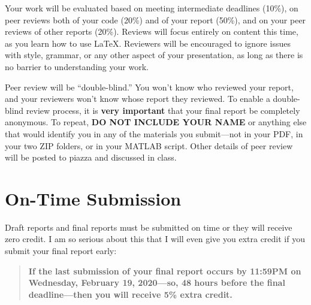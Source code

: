 \documentclass[conf]{new-aiaa}
\begin{document}
Your work will be evaluated based on meeting intermediate deadlines (10\%), on peer reviews both of your code (20\%) and of your report (50\%), and on your peer reviews of other reports (20\%). Reviews will focus entirely on content this time, as you learn how to use \LaTeX. Reviewers will be encouraged to ignore issues with style, grammar, or any other aspect of your presentation, as long as there is no barrier to understanding your work.

Peer review will be ``double-blind.'' You won't know who reviewed your report, and your reviewers won't know whose report they reviewed. To enable a double-blind review process, it is \textbf{very important} that your final report be completely anonymous. To repeat, \textbf{DO NOT INCLUDE YOUR NAME} or anything else that would identify you in any of the materials you submit---not in your PDF, in your two ZIP folders, or in your MATLAB script. Other details of peer review will be posted to piazza and discussed in class.


\section{On-Time Submission}

Draft reports and final reports must be submitted on time or they will receive zero credit. I am so serious about this that I will even give you extra credit if you submit your final report early:
\begin{quote}
\textbf{If the last submission of your final report occurs by 11:59PM on Wednesday, February 19, 2020---so, 48 hours before the final deadline---then you will receive 5\% extra credit.}
\end{quote}
\end{document}

